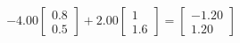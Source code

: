 \documentclass[preview]{standalone}
\begin{document}
\begin{align*}
-4.00 \begin{bmatrix} 0.8 \\ 0.5 \end{bmatrix} + 2.00 \begin{bmatrix} 1 \\ 1.6 \end{bmatrix} = \begin{bmatrix} -1.20 \\ 1.20 \end{bmatrix}
\end{align*}
\end{document}
